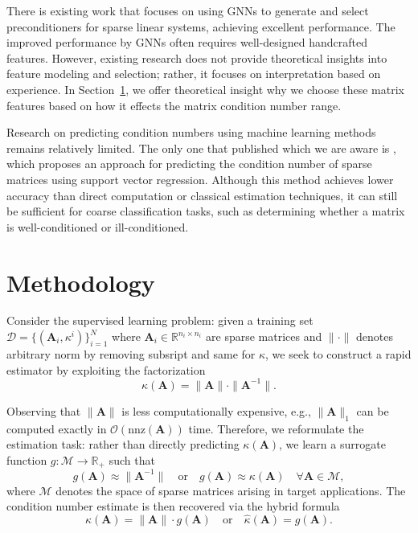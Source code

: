 \documentclass[11pt,a4paper]{article}
\theoremstyle{plain}
\theoremstyle{definition}
\theoremstyle{remark}
\begin{document}
There is existing work \cite{hausner2024neural, pmlr-v265-hausner25a} that focuses on using GNNs to generate and select preconditioners for sparse linear systems, achieving excellent performance. The improved performance by GNNs often requires well-designed handcrafted features. However, existing research does not provide theoretical insights into feature modeling and selection; rather, it focuses on interpretation based on experience.  In Section~\ref{sec:method}, we offer theoretical insight why we choose these matrix features based on how it effects the matrix condition number range. 



Research on predicting condition numbers using machine learning methods remains relatively limited. The only one that published which we are aware is \cite{doi:10.1137/1.9781611972757.47}, which proposes an approach for predicting the condition number of sparse matrices using support vector regression. Although this method achieves lower accuracy than direct computation or classical estimation techniques, it can still be sufficient for coarse classification tasks, such as determining whether a matrix is well-conditioned or ill-conditioned.





\section{Methodology}\label{sec:method}

Consider the supervised learning problem: given a training set $\mathcal{D} = \{(\mathbf{A}_i, \kappa^i)\}_{i=1}^N$ where $\mathbf{A}_i \in \mathbb{R}^{n_i \times n_i}$ are sparse matrices and $\|\cdot\|$ denotes arbitrary norm by removing subsript and same for $\kappa$, we seek to construct a rapid estimator by exploiting the factorization
\begin{equation}
\kappa(\mathbf{A}) = \|\mathbf{A}\| \cdot \|\mathbf{A}^{-1}\|.
\label{eq:cond_factorization}
\end{equation}

Observing that $\|\mathbf{A}\|$ is less computationally expensive, e.g., $\|\mathbf{A}\|_1$ can be computed exactly in $\mathcal{O}(\mathrm{nnz}(\mathbf{A}))$ time. Therefore, we reformulate the estimation task: rather than directly predicting $\kappa(\mathbf{A})$, we learn a surrogate function $g: \mathcal{M} \to \mathbb{R}_+$ such that
\begin{equation}\label{eq:learning_objective_hybrid}
g(\mathbf{A}) \approx \|\mathbf{A}^{-1}\| \quad \text{or} \quad g(\mathbf{A}) \approx \kappa(\mathbf{A})  \quad  \forall \mathbf{A} \in \mathcal{M},
\end{equation}
where $\mathcal{M}$ denotes the space of sparse matrices arising in target applications. The condition number estimate is then recovered via the hybrid formula
\begin{equation}
\hat{\kappa}(\mathbf{A}) = \|\mathbf{A}\| \cdot g(\mathbf{A}) \quad \text{or} \quad \hat{\kappa}(\mathbf{A}) =g(\mathbf{A}).
\label{eq:hybrid_estimate}
\end{equation}
\end{document}
